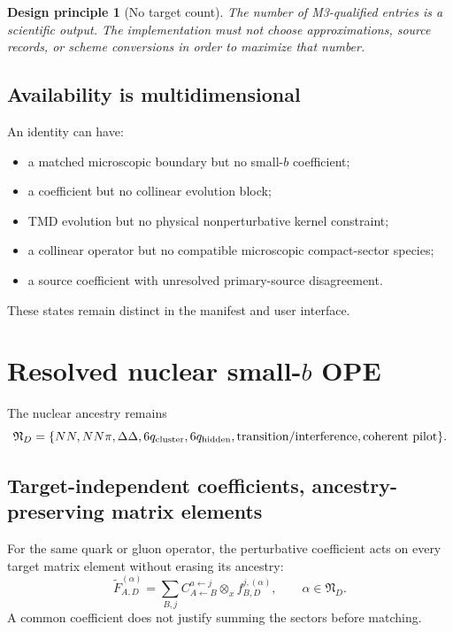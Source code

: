 \documentclass[11pt]{article}
\newtheorem{principle}[definition]{Design principle}
\newcommand{\otimesx}{\mathbin{\otimes_x}}
\begin{document}
\begin{principle}[No target count]
The number of M3-qualified entries is a scientific output.  The implementation must not choose approximations, source records, or scheme conversions in order to maximize that number.
\end{principle}

\subsection{Availability is multidimensional}

An identity can have:
\begin{itemize}
\item a matched microscopic boundary but no small-\(b\) coefficient;
\item a coefficient but no collinear evolution block;
\item TMD evolution but no physical nonperturbative kernel constraint;
\item a collinear operator but no compatible microscopic compact-sector species;
\item a source coefficient with unresolved primary-source disagreement.
\end{itemize}
These states remain distinct in the manifest and user interface.

\section{Resolved nuclear small-\texorpdfstring{\(b\)}{b} OPE}
\label{sec:nuclear}

The nuclear ancestry remains
\begin{equation}
 \mathfrak N_D=
 \{NN,NN\pi,\Delta\Delta,6q_{\rm cluster},6q_{\rm hidden},
 \text{transition/interference},\text{coherent pilot}\}.
 \label{eq:nuclear-ancestry}
\end{equation}

\subsection{Target-independent coefficients, ancestry-preserving matrix elements}

For the same quark or gluon operator, the perturbative coefficient acts on every target matrix element without erasing its ancestry:
\begin{equation}
 \widetilde F_{A,D}^{(\alpha)}
 =
 \sum_{B,j}
 C_{A\leftarrow B}^{a\leftarrow j}
 \otimesx
 f_{B,D}^{j,(\alpha)},
 \qquad
 \alpha\in\mathfrak N_D.
 \label{eq:ancestry-ope}
\end{equation}
A common coefficient does not justify summing the sectors before matching.
\end{document}
